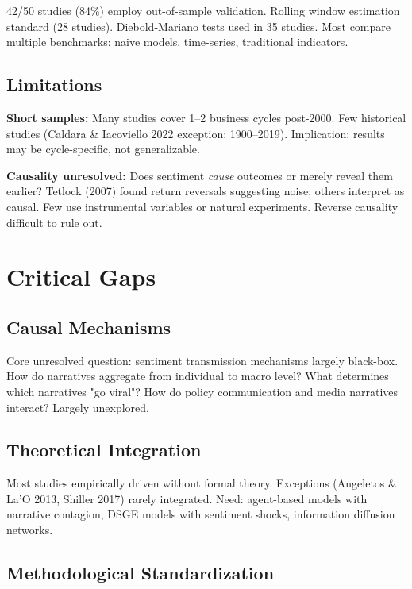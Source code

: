 \documentclass[11pt]{article}
\begin{document}
42/50 studies (84\%) employ out-of-sample validation. Rolling window estimation standard (28 studies). Diebold-Mariano tests used in 35 studies. Most compare multiple benchmarks: naive models, time-series, traditional indicators.

\subsection{Limitations}

\textbf{Short samples:} Many studies cover 1--2 business cycles post-2000. Few historical studies (Caldara \& Iacoviello 2022 exception: 1900--2019). Implication: results may be cycle-specific, not generalizable.

\textbf{Causality unresolved:} Does sentiment \textit{cause} outcomes or merely reveal them earlier? Tetlock (2007) found return reversals suggesting noise; others interpret as causal. Few use instrumental variables or natural experiments. Reverse causality difficult to rule out.

\section{Critical Gaps}

\subsection{Causal Mechanisms}

Core unresolved question: sentiment transmission mechanisms largely black-box. How do narratives aggregate from individual to macro level? What determines which narratives "go viral"? How do policy communication and media narratives interact? Largely unexplored.

\subsection{Theoretical Integration}

Most studies empirically driven without formal theory. Exceptions (Angeletos \& La'O 2013, Shiller 2017) rarely integrated. Need: agent-based models with narrative contagion, DSGE models with sentiment shocks, information diffusion networks.

\subsection{Methodological Standardization}
\end{document}
